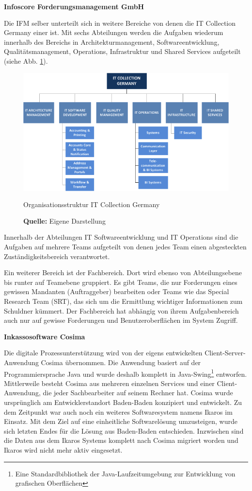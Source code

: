 \textbf{Infoscore Forderungsmanagement GmbH}

Die \gls{IFM} selber unterteilt sich in weitere Bereiche von denen die IT Collection Germany einer ist. Mit sechs Abteilungen werden die Aufgaben wiederum innerhalb des Bereichs in Architekturmanagement, Softwareentwicklung, Qualitätsmanagement, Operations, Infrastruktur und Shared Services aufgeteilt (siehe Abb. \ref{fig:organisationsstruktur}).
\begin{figure}[H]
  \centering
  \includegraphics[scale=0.78]{img/IT_Collection_Germany_Organisation.png}
  \caption{Organisationsstruktur IT Collection Germany}
  \caption*{\textbf{Quelle:} Eigene Darstellung}
  \label{fig:organisationsstruktur}
\end{figure}
Innerhalb der Abteilungen IT Softwareentwicklung und IT Operations sind die Aufgaben auf mehrere Teams aufgeteilt von denen jedes Team einen abgesteckten Zuständigkeitsbereich verantwortet.

Ein weiterer Bereich ist der Fachbereich. Dort wird ebenso von Abteilungsebene bis runter auf Teamebene gruppiert. Es gibt Teams, die nur Forderungen eines gewissen Mandanten (Auftraggeber) bearbeiten oder Teams wie das Special Research Team (SRT), das sich um die Ermittlung wichtiger Informationen zum Schuldner kümmert. Der Fachbereich hat abhängig von ihrem Aufgabenbereich auch nur auf gewisse Forderungen und Benutzeroberflächen im System Zugriff.

\textbf{Inkassosoftware Cosima}

Die digitale Prozessunterstützung wird von der eigens entwickelten Client-Server-Anwendung Cosima übernommen. Die Anwendung basiert auf der Programmiersprache Java und wurde deshalb komplett in Java-Swing\footnote{Eine Standardbibliothek der Java-Laufzeitumgebung zur Entwicklung von grafischen Oberflächen} entworfen. Mittlerweile besteht Cosima aus mehreren einzelnen Services und einer Client-Anwendung, die jeder Sachbearbeiter auf seinem Rechner hat. Cosima wurde ursprünglich am Entwicklerstandort Baden-Baden konzipiert und entwickelt. Zu dem Zeitpunkt war auch noch ein weiteres Softwaresystem namens Ikaros im Einsatz. Mit dem Ziel auf eine einheitliche Softwarelösung umzusteigen, wurde sich letzten Endes für die Lösung aus Baden-Baden entschieden. Inzwischen sind die Daten aus dem Ikaros Systems komplett nach Cosima migriert worden und Ikaros wird nicht mehr aktiv eingesetzt.

